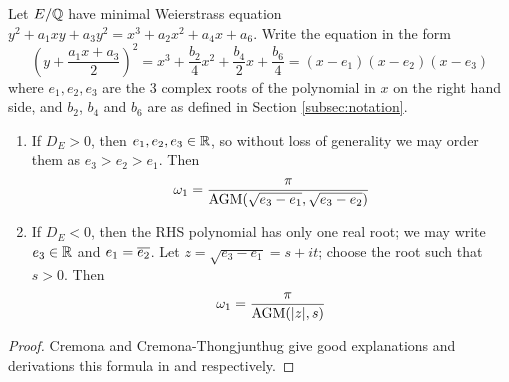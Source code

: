 \begin{proposition}\label{prop:real_period_by_AGM}
Let $E/\mathbb{Q}$ have minimal Weierstrass equation $y^2 + a_1 xy + a_3 y^2 = x^3 + a_2 x^2 + a_4 x + a_6$. Write the equation in the form
\begin{equation}\label{eqn:weierstrass_with_bn}
\left(y + \frac{a_1x + a_3}{2}\right)^2 = x^3 + \frac{b_2}{4} x^2 + \frac{b_4}{2} x + \frac{b_6}{4} = (x-e_1)(x-e_2)(x-e_3)
\end{equation}
where $e_1,e_2,e_3$ are the 3 complex roots of the polynomial in $x$ on the right hand side, and $b_2$, $b_4$ and $b_6$ are as defined in Section \ref{subsec:notation}.
\begin{enumerate}
\item If $D_E > 0$, then $e_1,e_2,e_3 \in \mathbb{R}$, so without loss of generality we may order them as $e_3 > e_2 > e_1$. Then
\begin{equation}\label{eqn:omega_D_pos}
\omega_1 = \frac{\pi}{\text{AGM}(\sqrt{e_3-e_1},\sqrt{e_3-e_2})}
\end{equation}
\item If $D_E < 0$, then the RHS polynomial has only one real root; we may write $e_3 \in \mathbb{R}$ and $e_1 = \overline{e_2}$. Let $z = \sqrt{e_3-e_1} = s + it$; choose the root such that $s>0$. Then
\begin{equation}\label{eqn:omega_D_neg}
\omega_1 = \frac{\pi}{\text{AGM}(|z|,s)}
\end{equation}
\end{enumerate}
\end{proposition}
\begin{proof}
Cremona and Cremona-Thongjunthug give good explanations and derivations this formula in \cite{Cre-1997} and \cite{Cre-2013} respectively.
\end{proof}

